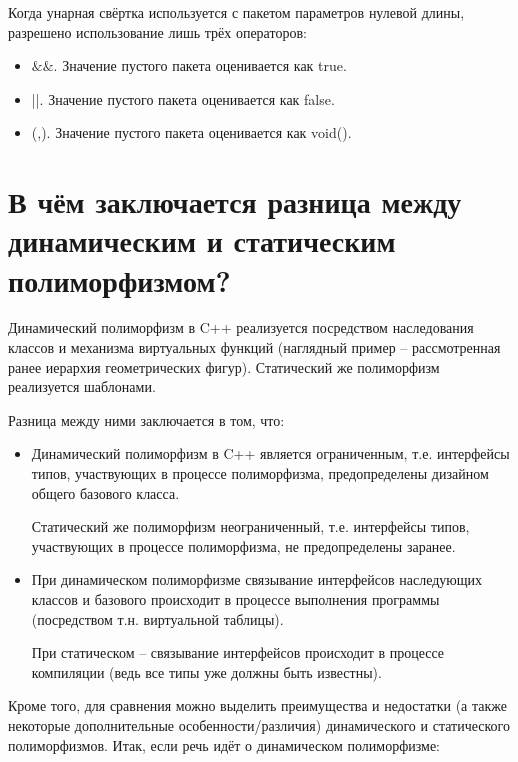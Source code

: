 \documentclass[a4paper,12pt]{article}	%
\begin{document}
	Когда унарная свёртка используется с пакетом параметров нулевой длины, разрешено использование лишь трёх операторов:
	
	\begin{itemize}
	
		\item $\&\&$. Значение пустого пакета оценивается как true.
		
		\item ||. Значение пустого пакета оценивается как false.
		
		\item (,). Значение пустого пакета оценивается как void().
	
	\end{itemize}

\newpage

\section{В чём заключается разница между динамическим и статическим полиморфизмом?}
	
	 Динамический полиморфизм в C++ реализуется посредством наследования классов и механизма виртуальных функций (наглядный пример -- рассмотренная ранее иерархия геометрических фигур). Статический же полиморфизм реализуется шаблонами.
	
	Разница между ними заключается в том, что:
	
	\begin{itemize}
	
		\item Динамический полиморфизм в C++ является ограниченным, т.е. интерфейсы типов, участвующих в процессе полиморфизма, предопределены дизайном общего базового класса.
		
		Статический же полиморфизм неограниченный, т.е. интерфейсы типов, участвующих в процессе полиморфизма, не предопределены заранее.
		
		\item При динамическом полиморфизме связывание интерфейсов наследующих классов и базового происходит в процессе выполнения программы (посредством т.н. виртуальной таблицы).
		
		При статическом -- связывание интерфейсов происходит в процессе компиляции (ведь все типы уже должны быть известны).
			
	\end{itemize}
	
	Кроме того, для сравнения можно выделить преимущества и недостатки (а также некоторые дополнительные особенности/различия) динамического и статического полиморфизмов. Итак, если речь идёт о динамическом полиморфизме:
	
\end{document}
